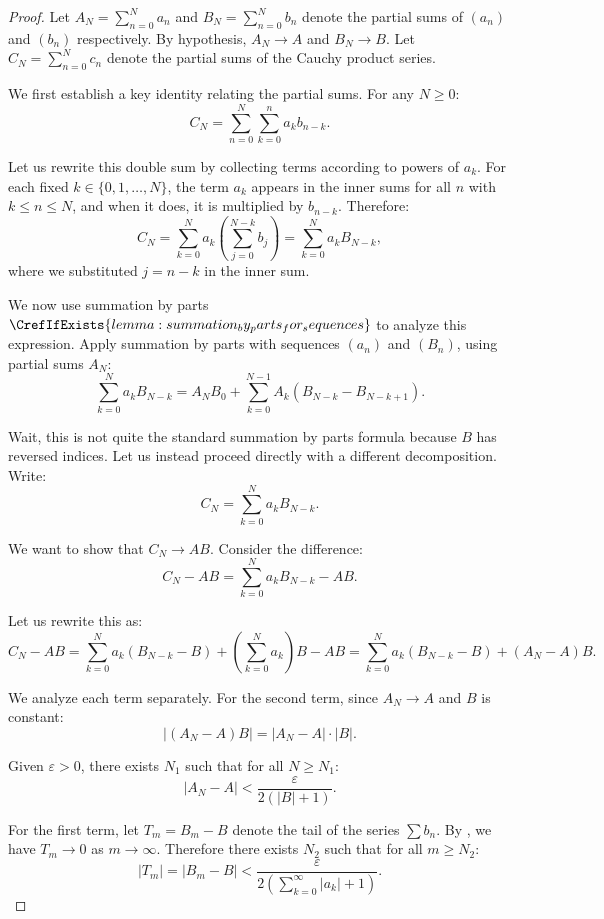 \begin{proof}
    Let $A_N = \sum_{n=0}^N a_n$ and $B_N = \sum_{n=0}^N b_n$ denote the partial sums of $(a_n)$ and $(b_n)$ respectively. By hypothesis, $A_N \to A$ and $B_N \to B$. Let $C_N = \sum_{n=0}^N c_n$ denote the partial sums of the Cauchy product series.

    We first establish a key identity relating the partial sums. For any $N \geq 0$:
    $$C_N = \sum_{n=0}^N \sum_{k=0}^n a_k b_{n-k}.$$

    Let us rewrite this double sum by collecting terms according to powers of $a_k$. For each fixed $k \in \{0, 1, \dots, N\}$, the term $a_k$ appears in the inner sums for all $n$ with $k \leq n \leq N$, and when it does, it is multiplied by $b_{n-k}$. Therefore:
    $$C_N = \sum_{k=0}^N a_k \left( \sum_{j=0}^{N-k} b_j \right) = \sum_{k=0}^N a_k B_{N-k},$$
    where we substituted $j = n - k$ in the inner sum.

    We now use summation by parts$\CrefIfExists{lemma:summation_by_parts_for_sequences}$ to analyze this expression. Apply summation by parts with sequences $(a_n)$ and $(B_n)$, using partial sums $A_N$:
    $$\sum_{k=0}^N a_k B_{N-k} = A_N B_0 + \sum_{k=0}^{N-1} A_k (B_{N-k} - B_{N-k+1}).$$

    Wait, this is not quite the standard summation by parts formula because $B$ has reversed indices. Let us instead proceed directly with a different decomposition. Write:
    $$C_N = \sum_{k=0}^N a_k B_{N-k}.$$

    We want to show that $C_N \to AB$. Consider the difference:
    $$C_N - AB = \sum_{k=0}^N a_k B_{N-k} - AB.$$

    Let us rewrite this as:
    $$C_N - AB = \sum_{k=0}^N a_k (B_{N-k} - B) + \left( \sum_{k=0}^N a_k \right) B - AB = \sum_{k=0}^N a_k (B_{N-k} - B) + (A_N - A)B.$$

    We analyze each term separately. For the second term, since $A_N \to A$ and $B$ is constant:
    $$|(A_N - A)B| = |A_N - A| \cdot |B|.$$

    Given $\varepsilon > 0$, there exists $N_1$ such that for all $N \geq N_1$:
    $$|A_N - A| < \frac{\varepsilon}{2(|B| + 1)}.$$

    For the first term, let $T_m = B_m - B$ denote the tail of the series $\sum b_n$. By , we have $T_m \to 0$ as $m \to \infty$. Therefore there exists $N_2$ such that for all $m \geq N_2$:
    $$|T_m| = |B_m - B| < \frac{\varepsilon}{2(\sum_{k=0}^\infty |a_k| + 1)}.$$


\end{proof}

